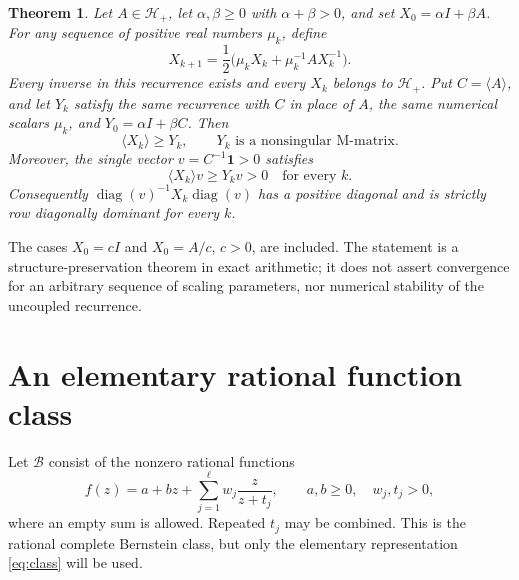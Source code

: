 \documentclass[11pt]{article}
\newtheorem{theorem}{Theorem}
\newcommand{\comp}[1]{\langle #1\rangle}
\newcommand{\ones}{\mathbf 1}
\newcommand{\diag}{\operatorname{diag}}
\begin{document}
\begin{theorem}\label{thm:newton}
Let $A\in\mathcal H_+$, let $\alpha,\beta\ge0$ with $\alpha+\beta>0$, and set $X_0=\alpha I+\beta A$. For any sequence of positive real numbers $\mu_k$, define
\begin{equation}\label{eq:newton}
X_{k+1}=\frac12\bigl(\mu_kX_k+\mu_k^{-1}A X_k^{-1}\bigr).
\end{equation}
Every inverse in this recurrence exists and every $X_k$ belongs to $\mathcal H_+$. Put $C=\comp A$, and let $Y_k$ satisfy the same recurrence with $C$ in place of $A$, the same numerical scalars $\mu_k$, and $Y_0=\alpha I+\beta C$. Then
\begin{equation}\label{eq:comparison}
\comp{X_k}\ge Y_k,\qquad Y_k\text{ is a nonsingular M-matrix}.
\end{equation}
Moreover, the single vector $v=C^{-1}\ones>0$ satisfies
\[
\comp{X_k}v\ge Y_kv>0\quad\text{for every }k.
\]
Consequently $\diag(v)^{-1}X_k\diag(v)$ has a positive diagonal and is strictly row diagonally dominant for every $k$.
\end{theorem}

The cases $X_0=cI$ and $X_0=A/c$, $c>0$, are included. The statement is a structure-preservation theorem in exact arithmetic; it does not assert convergence for an arbitrary sequence of scaling parameters, nor numerical stability of the uncoupled recurrence.

\section{An elementary rational function class}
Let $\mathcal B$ consist of the nonzero rational functions
\begin{equation}\label{eq:class}
f(z)=a+bz+\sum_{j=1}^{\ell}w_j\frac{z}{z+t_j},
\qquad a,b\ge0,\quad w_j,t_j>0,
\end{equation}
where an empty sum is allowed. Repeated $t_j$ may be combined. This is the rational complete Bernstein class, but only the elementary representation \eqref{eq:class} will be used.
\end{document}
